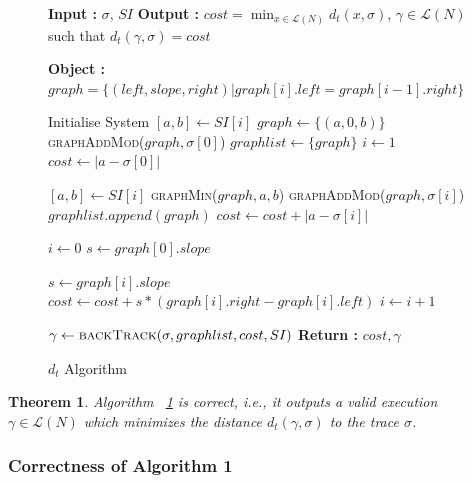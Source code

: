 \documentclass[conference]{IEEEtran}
\makeatletter
\newcommand{\removelatexerror}{\let\@latex@error\@gobble}
\newtheorem{theorem}{Theorem}
\makeatother
\begin{document}
		\begin{figure}[!t]
			\removelatexerror
			\begin{algorithm}[H]
				\caption{$d_t$ Algorithm}
				\label{StampAlgo}
				\begin{algorithmic}
					\State \textbf{Input : }  $\sigma$, $SI$
					\State \textbf{Output : }  $cost = \min_{x \in \mathcal{L}(N)}{d_t(x, \sigma)}$, $\gamma \in \mathcal{L}(N)$ such that $d_t(\gamma, \sigma) = cost$
					
					\State \textbf{Object :} $graph = \{(left, slope, right) | graph[i].left = graph[i-1].right\}$
					
					\State Initialise System 
					\State $[a, b] \gets SI[i]$
					\State $graph \gets \{(a, 0, b)\}$
					\State \textsc{graphAddMod}($graph, \sigma[0]$)
					\State $graphlist \gets \{graph\}$
					\State $i \gets 1$
					\State $cost \gets |a - \sigma[0]|$
					
					\State $[a, b] \gets SI[i]$
					\State \textsc{graphMin}($graph, a, b$)
					\State \textsc{graphAddMod}($graph, \sigma[i]$)
					\State $graphlist.append(graph)$
					\State $cost \gets cost + |a - \sigma[i]|$
					\EndWhile
					
					\State $i \gets 0$ 
					\State $s \gets graph[0].slope$
					
					\State $s \gets graph[i].slope$ 
					\State $cost \gets cost + s * (graph[i].right - graph[i].left)$
					\State $i \gets i + 1$
					\EndWhile
					
					\State $\gamma \gets \textsc{backTrack}(\sigma, graphlist, cost, SI)$
					\State \textbf{Return : } $cost, \gamma$
					\EndProcedure
				\end{algorithmic}
			\end{algorithm}
		\end{figure}
		
		\begin{theorem}\label{StampAlgoCorr}
			Algorithm ~\ref{StampAlgo} is correct, i.e., it outputs a valid execution
			$\gamma \in \mathcal{L}(N)$ which minimizes the distance $d_t(\gamma, \sigma)$
			to the trace $\sigma$.
		\end{theorem}
		
		\subsubsection{Correctness of Algorithm 1}
		
\end{document}
